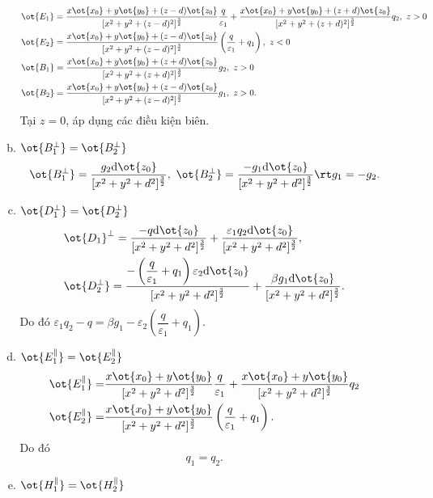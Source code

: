 \begin{loigiai}
\begin{enumerate}[1)]
\begin{enumerate}[a)]
        \begin{align*}
            &\ot{E_1}=\dfrac{x\ot{x_0}+y\ot{y_0}+(z-d)\ot{z_0}}{[x^2+y^2+(z-d)^2]^{\frac{3}{2}}}\dfrac{q}{\varepsilon_1}+\dfrac{x\ot{x_0}+y\ot{y_0}+(z+d)\ot{z_0}}{[x^2+y^2+(z+d)^2]^{\frac{3}{2}}}q_2, ~z>0\\
            &\ot{E_2}=\dfrac{x\ot{x_0}+y\ot{y_0}+(z-d)\ot{z_0}}{[x^2+y^2+(z-d)^2]^{\frac{3}{2}}}\left(\dfrac{q}{\varepsilon_1}+q_1\right), ~z<0\\
            &\ot{B_1}=\dfrac{x\ot{x_0}+y\ot{y_0}+(z+d)\ot{z_0}}{[x^2+y^2+(z+d)^2]^{\frac{3}{2}}}g_2, ~z>0\\
            &\ot{B_2}=\dfrac{x\ot{x_0}+y\ot{y_0}+(z-d)\ot{z_0}}{[x^2+y^2+(z-d)^2]^{\frac{3}{2}}}g_1, ~z>0.
        \end{align*}
        Tại $z=0$, áp dụng các điều kiện biên.
        \item $\ot{B_1^{\bot}}=\ot{B_2^{\bot}}$
        \[\ot{B_1^{\bot}}=\dfrac{g_2\mathrm{d}\ot{z_0}}{[x^2+y^2+d^2]^{\frac{3}{2}}},~\ot{B_2^{\bot}}=\dfrac{-g_1\mathrm{d}\ot{z_0}}{[x^2+y^2+d^2]^{\frac{3}{2}}}\rt g_1=-g_2.\]
        \item $\ot{D_1^{\bot}}=\ot{D_2^{\bot}}$
        \begin{align*}
            &\ot{D_1}^{\bot}=\dfrac{-q\mathrm{d}\ot{z_0}}{[x^2+y^2+d^2]^{\frac{3}{2}}}+\dfrac{\varepsilon_1q_2\mathrm{d}\ot{z_0}}{[x^2+y^2+d^2]^{\frac{3}{2}}},\\
            &\ot{D_2^{\bot}}=\dfrac{-\left(\dfrac{q}{\varepsilon_1}+q_1\right)\varepsilon_2\mathrm{d}\ot{z_0}}{[x^2+y^2+d^2]^{\frac{3}{2}}}+\dfrac{\beta g_1\mathrm{d}\ot{z_0}}{[x^2+y^2+d^2]^{\frac{3}{2}}}.
        \end{align*}
        Do đó $\varepsilon_1q_2-q=\beta g_1-\varepsilon_2\left(\dfrac{q}{\varepsilon_1} +q_1\right)$.
        \item $\ot{E_1^{\parallel}}=\ot{E_2^{\parallel}}$
        \begin{align*}
           \ot{E_1^{\parallel}} =&\dfrac{x\ot{x_0}+y\ot{y_0}}{[x^2+y^2+d^2]^{\frac{3}{2}}}\dfrac{q}{\varepsilon_1}+\dfrac{x\ot{x_0}+y\ot{y_0}}{[x^2+y^2+d^2]^{\frac{3}{2}}}q_2\\
            \ot{E_2^{\parallel}}=&\dfrac{x\ot{x_0}+y\ot{y_0}}{[x^2+y^2+d^2]^{\frac{3}{2}}}\left(\dfrac{q}{\varepsilon_1}+q_1\right).
        \end{align*}
            Do đó 
            \[q_1=q_2.\tag{3} \label{cg.sang.2.2.3} \]
        \item $\ot{H_1^{\parallel}}=\ot{H_2^{\parallel}}$
        \begin{align*}

\end{align*}
\end{enumerate}
\end{enumerate}
\end{loigiai}
